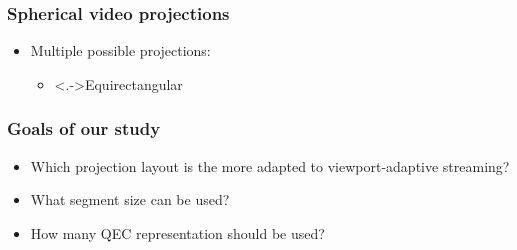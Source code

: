 \begin{frame}[c]
   \frametitle{Spherical video projections}

   \vfill

   \begin{itemize}
      \item<+-> Multiple possible projections:
      \begin{itemize}
         \item \uncover<.->{Equirectangular}
      \end{itemize}
   \end{itemize}

   \vfill

   \begin{independentCounter}
      
   \end{independentCounter}

\end{frame}

\begin{frame}[c]
   \frametitle{Goals of our study}

   \vfill
   \begin{itemize}[<+->]
      \item Which projection layout is the more adapted to viewport-adaptive streaming?
      \vfill
      \item What segment size can be used?
      \vfill
      \item How many QEC representation should be used?
   \end{itemize}
   \vfill

\end{frame}
